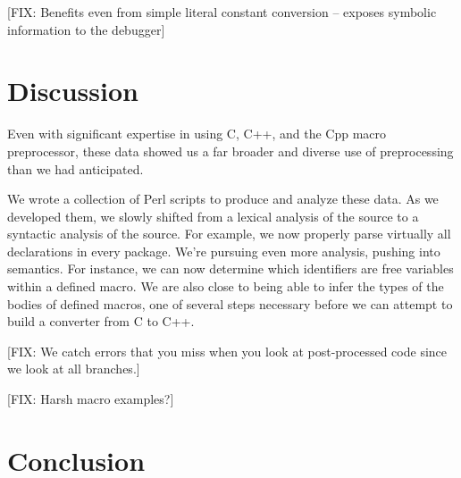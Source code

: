 [FIX: Benefits even from simple literal constant conversion -- exposes
symbolic information to the debugger]


\section{Discussion}\label{sec:discussion}

Even with significant expertise in using C, C++, and the Cpp macro
preprocessor, these data showed us a far broader and diverse use of
preprocessing than we had anticipated.  

We wrote a collection of Perl scripts to produce and analyze these
data.  As we developed them, we slowly shifted from a lexical analysis
of the source to a syntactic analysis of the source.  For example, we
now properly parse virtually all declarations in every package.  We're
pursuing even more analysis, pushing into semantics.  For instance, we
can now determine which identifiers are free variables within a defined
macro.  We are also close to being able to infer the types of the bodies
of defined macros, one of several steps necessary before we can attempt
to build a converter from C to C++.

[FIX: We catch errors that you miss when you look at post-processed code
since we look at all branches.]

[FIX: Harsh macro examples?]

\section{Conclusion}\label{sec:conclusion}

\small 


